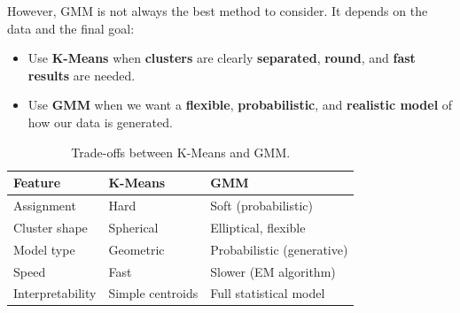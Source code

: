 However, GMM is not always the best method to consider. It depends on the data and the final goal:
\begin{itemize}
    \item Use \textbf{K-Means} when \textbf{clusters} are clearly \textbf{separated}, \textbf{round}, and \textbf{fast results} are needed.
    \item Use \textbf{GMM} when we want a \textbf{flexible}, \textbf{probabilistic}, and \textbf{realistic model} of how our data is generated.
\end{itemize}

\newpage

\begin{table}[!htp]
    \centering
    \begin{tabular}{@{} l l l @{}}
        \toprule
        Feature          & K-Means          & GMM \\
        \midrule
        Assignment       & Hard             & Soft (probabilistic)       \\ [.3em]
        Cluster shape    & Spherical        & Elliptical, flexible       \\ [.3em]
        Model type       & Geometric        & Probabilistic (generative) \\ [.3em]
        Speed            & Fast             & Slower (EM algorithm)      \\ [.3em]
        Interpretability & Simple centroids & Full statistical model     \\
        \bottomrule
    \end{tabular}
    \caption{Trade-offs between K-Means and GMM.}
\end{table}